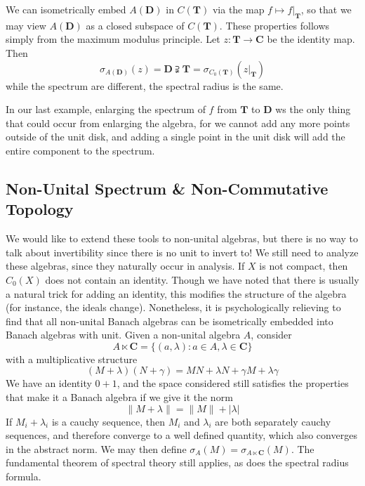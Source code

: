 \begin{example}
    We can isometrically embed $A(\mathbf{D})$ in $C(\mathbf{T})$ via the map $f \mapsto f|_\mathbf{T}$, so that we may view $A(\mathbf{D})$ as a closed subspace of $C(\mathbf{T})$. These properties follows simply from the maximum modulus principle. Let $z: \mathbf{T} \to \mathbf{C}$ be the identity map. Then
    \[ \sigma_{A(\mathbf{D})}(z) = \mathbf{D} \supsetneqq \mathbf{T} = \sigma_{C_0(\mathbf{T})}(z|_\mathbf{T}) \]
    while the spectrum are different, the spectral radius is the same.
\end{example}

In our last example, enlarging the spectrum of $f$ from $\mathbf{T}$ to $\mathbf{D}$ ws the only thing that could occur from enlarging the algebra, for we cannot add any more points outside of the unit disk, and adding a single point in the unit disk will add the entire component to the spectrum.

\subsection{Non-Unital Spectrum \& Non-Commutative Topology}

We would like to extend these tools to non-unital algebras, but there is no way to talk about invertibility since there is no unit to invert to! We still need to analyze these algebras, since they naturally occur in analysis. If $X$ is not compact, then $C_0(X)$ does not contain an identity. Though we have noted that there is usually a natural trick for adding an identity, this modifies the structure of the algebra (for instance, the ideals change). Nonetheless, it is psychologically relieving to find that all non-unital Banach algebras can be isometrically embedded into Banach algebras with unit. Given a non-unital algebra $A$, consider
%
\[ A \ltimes \mathbf{C} = \{ (a,\lambda) : a \in A, \lambda \in \mathbf{C} \} \]
%
with a multiplicative structure
%
\[ (M + \lambda)(N + \gamma) = MN + \lambda N + \gamma M + \lambda \gamma \]
%
We have an identity $0 + 1$, and the space considered still satisfies the properties that make it a Banach algebra if we give it the norm
%
\[ \| M + \lambda \| = \| M \| + |\lambda| \]
%
If $M_i + \lambda_i$ is a cauchy sequence, then $M_i$ and $\lambda_i$ are both separately cauchy sequences, and therefore converge to a well defined quantity, which also converges in the abstract norm. We may then define $\sigma_A(M) = \sigma_{A \ltimes \mathbf{C}}(M)$. The fundamental theorem of spectral theory still applies, as does the spectral radius formula.

